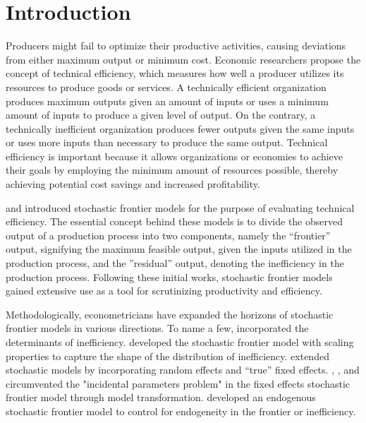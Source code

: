 
\section{Introduction}\label{sec_intro}
\vspace{5pt}

Producers might fail to optimize their productive activities, causing deviations from either maximum output or minimum cost. Economic researchers propose the concept of technical efficiency, which measures how well a producer utilizes its resources to produce goods or services. A technically efficient organization produces maximum outputs given an amount of inputs or uses a minimum amount of inputs to produce a given level of output. On the contrary, a technically inefficient organization produces fewer outputs given the same inputs or uses more inputs than necessary to produce the same output. Technical efficiency is important because it allows organizations or economies to achieve their goals by employing the minimum amount of resources possible, thereby achieving potential cost savings and increased profitability. 

\cite*{aignerFormulationEstimationStochastic1977} and \cite{meeusen1977efficiency} introduced stochastic frontier models for the purpose of evaluating technical efficiency. The essential concept behind these models is to divide the observed output of a production process into two components, namely the “frontier” output, signifying the maximum feasible output, given the inputs utilized in the production process, and the ”residual” output, denoting the inefficiency in the production process. Following these initial works, stochastic frontier models gained extensive use as a tool for scrutinizing productivity and efficiency. 

Methodologically, econometricians have expanded the horizons of stochastic frontier models in various directions. To name a few, \cite{battese1995model} incorporated the determinants of inefficiency. \cite{wang2003stochastic} developed the stochastic frontier model with scaling properties to capture the shape of the distribution of inefficiency. \cite{greene2005fixed} extended stochastic models by incorporating random effects and “true” fixed effects. \cite{belotti2018consistent}, \cite*{chen2014consistent}, and \cite{ wang2010estimating} circumvented the "incidental parameters problem" in the fixed effects stochastic frontier model through model transformation. \cite{karakaplan2017handling} developed an endogenous stochastic frontier model to control for endogeneity in the frontier or inefficiency. 


